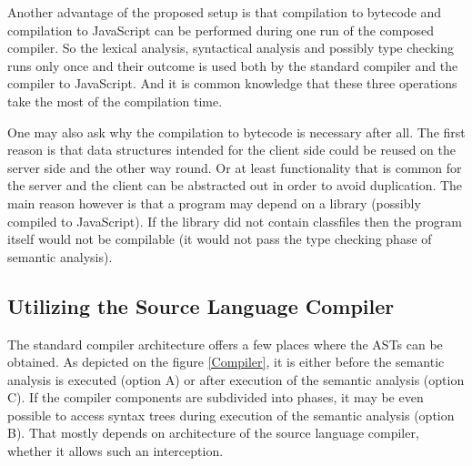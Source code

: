 \documentclass[12pt,a4paper]{report}
\begin{document}
Another advantage of the proposed setup is that compilation to bytecode and compilation to JavaScript can be performed during one run of the composed compiler. So the lexical analysis, syntactical analysis and possibly type checking runs only once and their outcome is used both by the standard compiler and the compiler to JavaScript. And it is common knowledge that these three operations take the most of the compilation time. 

One may also ask why the compilation to bytecode is necessary after all. The first reason is that data structures intended for the client side could be reused on the server side and the other way round. Or at least functionality that is common for the server and the client can be abstracted out in order to avoid duplication. The main reason however is that a program may depend on a library (possibly compiled to JavaScript). If the library did not contain classfiles then the program itself would not be compilable (it would not pass the type checking phase of semantic analysis).

\subsection{Utilizing the Source Language Compiler}

The standard compiler architecture offers a few places where the ASTs can be obtained. As depicted on the figure \ref{Compiler}, it is either before the semantic analysis is executed (option A) or after execution of the semantic analysis (option C). If the compiler components are subdivided into phases, it may be even possible to access syntax trees during execution of the semantic analysis (option B). That mostly depends on architecture of the source language compiler, whether it allows such an interception.
\end{document}
